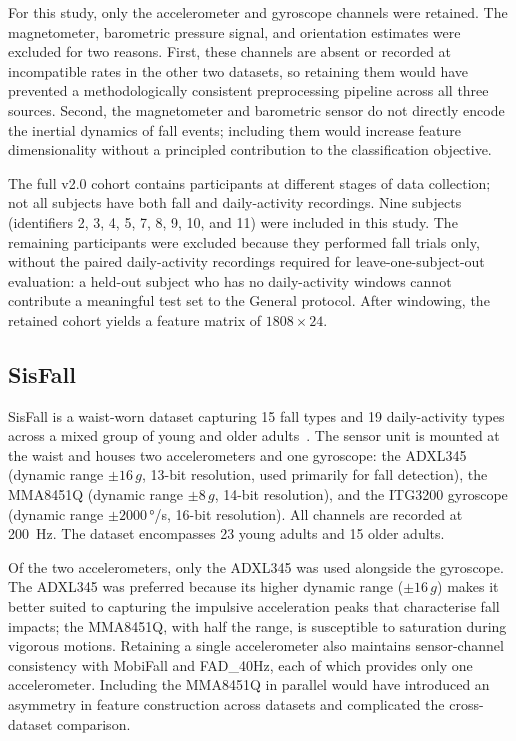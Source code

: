 For this study, only the accelerometer and gyroscope channels were retained. The magnetometer, barometric pressure signal, and orientation estimates were excluded for two reasons. First, these channels are absent or recorded at incompatible rates in the other two datasets, so retaining them would have prevented a methodologically consistent preprocessing pipeline across all three sources. Second, the magnetometer and barometric sensor do not directly encode the inertial dynamics of fall events; including them would increase feature dimensionality without a principled contribution to the classification objective.

The full v2.0 cohort contains participants at different stages of data collection; not all subjects have both fall and daily-activity recordings. Nine subjects (identifiers 2, 3, 4, 5, 7, 8, 9, 10, and 11) were included in this study. The remaining participants were excluded because they performed fall trials only, without the paired daily-activity recordings required for leave-one-subject-out evaluation: a held-out subject who has no daily-activity windows cannot contribute a meaningful test set to the General protocol. After windowing, the retained cohort yields a feature matrix of $1808 \times 24$.

\subsection{SisFall}
\label{subsubsec:sisfall}

SisFall is a waist-worn dataset capturing 15 fall types and 19 daily-activity types across a mixed group of young and older adults~\parencite{sisfall}. The sensor unit is mounted at the waist and houses two accelerometers and one gyroscope: the ADXL345 (dynamic range $\pm 16\,g$, 13-bit resolution, used primarily for fall detection), the MMA8451Q (dynamic range $\pm 8\,g$, 14-bit resolution), and the ITG3200 gyroscope (dynamic range $\pm 2000$\,°/s, 16-bit resolution). All channels are recorded at 200~Hz. The dataset encompasses 23 young adults and 15 older adults.

Of the two accelerometers, only the ADXL345 was used alongside the gyroscope. The ADXL345 was preferred because its higher dynamic range ($\pm 16\,g$) makes it better suited to capturing the impulsive acceleration peaks that characterise fall impacts; the MMA8451Q, with half the range, is susceptible to saturation during vigorous motions. Retaining a single accelerometer also maintains sensor-channel consistency with MobiFall and FAD\_40Hz, each of which provides only one accelerometer. Including the MMA8451Q in parallel would have introduced an asymmetry in feature construction across datasets and complicated the cross-dataset comparison.

